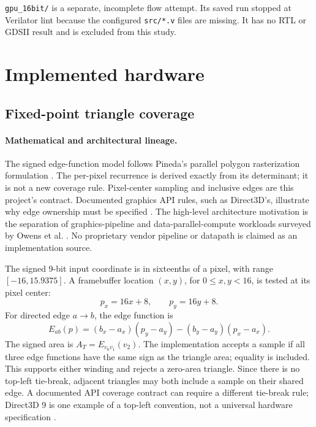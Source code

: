 \documentclass[10pt,a4paper]{article}
\begin{document}
\texttt{gpu\_16bit/} is a separate, incomplete flow attempt. Its saved run
stopped at Verilator lint because the configured \texttt{src/*.v} files are
missing. It has no RTL or GDSII result and is excluded from this study.

\section{Implemented hardware}

\subsection{Fixed-point triangle coverage}

\paragraph{Mathematical and architectural lineage.}
The signed edge-function model follows Pineda's parallel polygon
rasterization formulation \cite{Pineda1988}. The per-pixel recurrence is
derived exactly from its determinant; it is not a new coverage rule.
Pixel-center sampling and inclusive edges are this project's contract.
Documented graphics API rules, such as Direct3D's, illustrate why edge
ownership must be specified \cite{MicrosoftRasterization}. The high-level
architecture motivation is the separation of graphics-pipeline and
data-parallel-compute workloads surveyed by Owens et al.
\cite{OwensGPU2007}. No proprietary vendor pipeline or datapath is claimed
as an implementation source.

The signed 9-bit input coordinate is in sixteenths of a pixel, with range
\([-16,15.9375]\). A framebuffer location \((x,y)\), for
\(0\le x,y<16\), is tested at its pixel center:
\begin{equation}
 p_x=16x+8,\qquad p_y=16y+8.
\end{equation}
For directed edge \(a\rightarrow b\), the edge function is
\begin{equation}
 E_{ab}(p)=(b_x-a_x)(p_y-a_y)-(b_y-a_y)(p_x-a_x).
 \label{eq:edge}
\end{equation}
The signed area is \(A_T=E_{v_0v_1}(v_2)\). The implementation accepts a
sample if all three edge functions have the same sign as the triangle area;
equality is included. This supports either winding and rejects a zero-area
triangle. Since there is no top-left tie-break, adjacent triangles may both
include a sample on their shared edge. A documented API coverage contract
can require a different tie-break rule; Direct3D 9 is one example of a
top-left convention, not a universal hardware specification
\cite{MicrosoftRasterization}.
\end{document}
